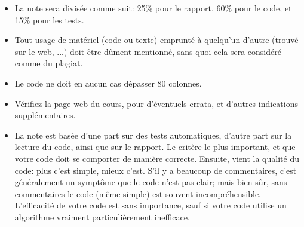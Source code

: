 \documentclass{article}
\begin{document}
\begin{itemize}
\item La note sera divisée comme suit: 25\% pour le rapport, 60\% pour le
  code, et 15\% pour les tests.
\item Tout usage de matériel (code ou texte) emprunté à quelqu'un d'autre
  (trouvé sur le web, ...) doit être dûment mentionné, sans quoi cela sera
  considéré comme du plagiat.
\item Le code ne doit en aucun cas dépasser 80 colonnes.
\item Vérifiez la page web du cours, pour d'éventuels errata, et d'autres
  indications supplémentaires.
\item La note est basée d'une part sur des tests automatiques, d'autre part
  sur la lecture du code, ainsi que sur le rapport.  Le critère le plus
  important, et que votre code doit se comporter de manière correcte.
  Ensuite, vient la qualité du code: plus c'est simple, mieux c'est.
  S'il y a beaucoup de commentaires, c'est généralement un symptôme que le
  code n'est pas clair; mais bien sûr, sans commentaires le code (même
  simple) est souvent incompréhensible.  L'efficacité de votre code est sans
  importance, sauf si votre code utilise un algorithme vraiment
  particulièrement inefficace.
\end{itemize}
\end{document}

